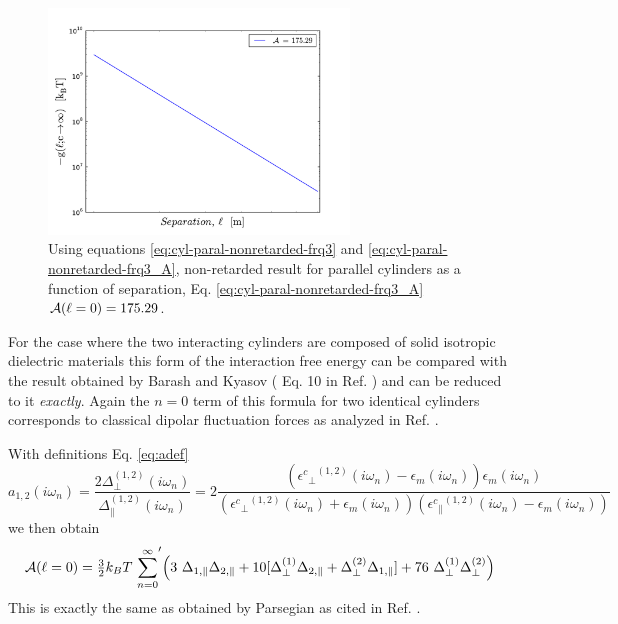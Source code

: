 \documentclass[onecolumn,letterpaper,amsmath,amssymb,floatfix,aps,superscriptaddress]{revtex4}
\begin{document}
\begin{figure}[t]
\centerline{\includegraphics[width=8cm]{./140220_cyl-cyl/Nonret_parallel_G_vs_l.pdf}}
\caption{\label{f} Using equations \ref{eq:cyl-paral-nonretarded-frq3} and \ref{eq:cyl-paral-nonretarded-frq3_A}, non-retarded result for parallel cylinders as a function of separation, Eq. \ref{eq:cyl-paral-nonretarded-frq3_A} ${\cal A}(\ell = 0) = 175.29$.}
\end{figure}

For the case where the two interacting cylinders are composed of solid isotropic dielectric materials this form of the interaction free energy can be compared with the result obtained by Barash and Kyasov ( Eq. 10 in Ref. ) and can be reduced to it {\sl exactly}. Again the $n = 0$ term of this formula for two identical cylinders corresponds to classical dipolar fluctuation forces as analyzed in Ref. .

With definitions Eq. \ref{eq:adef}
\begin{equation}
a_{1,2}(i \omega_n) = \frac{2 \Delta_{\perp}^{(1,2)}(i \omega_n)}{\Delta_{\parallel}^{(1,2)}(i \omega_n)} = 2 \frac{({{\epsilon^{c}}_{\perp}}^{(1,2)}(i \omega_n) -\epsilon_{m}(i \omega_n)) \epsilon_{m}(i \omega_n)}{({{\epsilon^{c}}_{\perp}}^{(1,2)}(i \omega_n)+\epsilon_{m}(i \omega_n)) ({{\epsilon^{c}}_{\parallel}}^{(1,2)}(i \omega_n) -\epsilon_{m}(i \omega_n))}
\end{equation}
we then obtain
\begin{equation}
{\cal A}(\ell = 0) = {\textstyle\frac32} {k_BT} ~ {\sum_{n=0}^{\infty}}' \Big( 3~ \Delta_{1,\parallel} \Delta_{2,\parallel}
 + 10 [ \Delta_{\perp}^{(1)}\Delta_{2,\parallel} + \Delta_{\perp}^{(2)}\Delta_{1,\parallel} ] + 76~ \Delta_{\perp}^{(1)} \Delta_{\perp}^{(2)}\Big)
\end{equation}
This is exactly the same as obtained by Parsegian as cited in Ref. \cite{Parscyl}.
\end{document}

